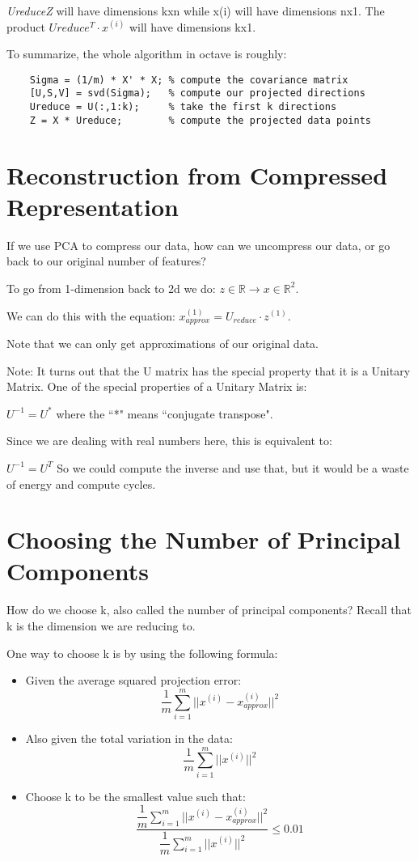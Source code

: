 \textit{UreduceZ} will have dimensions kxn while x(i) will have dimensions nx1. The product $Ureduce^T \cdot x^{(i)}$ will have dimensions kx1.

To summarize, the whole algorithm in octave is roughly:

\begin{verbatim}
	Sigma = (1/m) * X' * X; % compute the covariance matrix
	[U,S,V] = svd(Sigma);   % compute our projected directions
	Ureduce = U(:,1:k);     % take the first k directions
	Z = X * Ureduce;        % compute the projected data points
\end{verbatim}
\section{Reconstruction from Compressed Representation}
If we use PCA to compress our data, how can we uncompress our data, or go back to our original number of features?

To go from 1-dimension back to 2d we do: $z \in \mathbb{R} \rightarrow x \in \mathbb{R}^2$.

We can do this with the equation: $x_{approx}^{(1)} = U_{reduce} \cdot z^{(1)}$.

Note that we can only get approximations of our original data.

Note: It turns out that the U matrix has the special property that it is a Unitary Matrix. One of the special properties of a Unitary Matrix is:

$U^{-1} = U^{*}$ where the ``*" means ``conjugate transpose".

Since we are dealing with real numbers here, this is equivalent to:

$U^{-1} = U^T$ So we could compute the inverse and use that, but it would be a waste of energy and compute cycles.

\section{Choosing the Number of Principal Components}
How do we choose k, also called the number of principal components? Recall that k is the dimension we are reducing to.

One way to choose k is by using the following formula:

\begin{itemize}
	\item Given the average squared projection error: $$\dfrac{1}{m}\sum^m_{i=1}||x^{(i)} - x_{approx}^{(i)}||^2$$
	\item Also given the total variation in the data: $$\dfrac{1}{m}\sum^m_{i=1}||x^{(i)}||^2 $$
	\item Choose k to be the smallest value such that: $$\dfrac{\dfrac{1}{m}\sum^m_{i=1}||x^{(i)} - x_{approx}^{(i)}||^2}{\dfrac{1}{m}\sum^m_{i=1}||x^{(i)}||^2} \leq 0.01 $$
\end{itemize}

